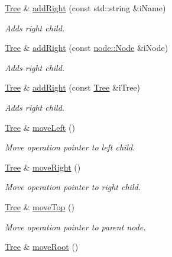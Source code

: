 \begin{DoxyCompactItemize}
\hyperlink{classtree_1_1Tree}{Tree} \& \hyperlink{classtree_1_1Tree_a23e77e37d23040fabb35eeec86370b02}{add\-Right} (const std\-::string \&i\-Name)
\begin{DoxyCompactList}\small\item\em Adds right child. \end{DoxyCompactList}\item 
\hyperlink{classtree_1_1Tree}{Tree} \& \hyperlink{classtree_1_1Tree_aa4ac522514b647e10a087ea388868e31}{add\-Right} (const \hyperlink{classnode_1_1Node}{node\-::\-Node} \&i\-Node)
\begin{DoxyCompactList}\small\item\em Adds right child. \end{DoxyCompactList}\item 
\hyperlink{classtree_1_1Tree}{Tree} \& \hyperlink{classtree_1_1Tree_a1fe1a6b148f1ea7258e649f73e3b6a6f}{add\-Right} (const \hyperlink{classtree_1_1Tree}{Tree} \&i\-Tree)
\begin{DoxyCompactList}\small\item\em Adds right child. \end{DoxyCompactList}\item 
\hyperlink{classtree_1_1Tree}{Tree} \& \hyperlink{classtree_1_1Tree_af3de9693422e9af3e5b47f8bc386d821}{move\-Left} ()
\begin{DoxyCompactList}\small\item\em Move operation pointer to left child. \end{DoxyCompactList}\item 
\hyperlink{classtree_1_1Tree}{Tree} \& \hyperlink{classtree_1_1Tree_a783680aa05d80764a53353ab7b0ef1fb}{move\-Right} ()
\begin{DoxyCompactList}\small\item\em Move operation pointer to right child. \end{DoxyCompactList}\item 
\hypertarget{classtree_1_1Tree_ae664afeb1d788e51ceeb37d6720d7578}{\hyperlink{classtree_1_1Tree}{Tree} \& \hyperlink{classtree_1_1Tree_ae664afeb1d788e51ceeb37d6720d7578}{move\-Top} ()}\label{classtree_1_1Tree_ae664afeb1d788e51ceeb37d6720d7578}

\begin{DoxyCompactList}\small\item\em Move operation pointer to parent node. \end{DoxyCompactList}\item 
\hypertarget{classtree_1_1Tree_ad64be9c6cdaf79bfbc16b7e25ec7f072}{\hyperlink{classtree_1_1Tree}{Tree} \& \hyperlink{classtree_1_1Tree_ad64be9c6cdaf79bfbc16b7e25ec7f072}{move\-Root} ()}\label{classtree_1_1Tree_ad64be9c6cdaf79bfbc16b7e25ec7f072}


\end{DoxyCompactItemize}

